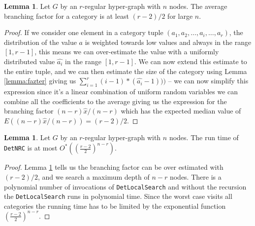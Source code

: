\documentclass{book}
\theoremstyle{definition}
\newtheorem{lemma}[theorem]{Lemma}
\begin{document}
\begin{lemma} \label{lemma:time}
  Let $G$ by an $r$-regular hyper-graph with $n$ nodes. The average branching factor for a category is at least $(r - 2) / 2$ for large $n$.
\end{lemma}
\begin{proof}
  If we consider one element in a category tuple $(a_1, a_2, \dots, a_i, \dots, a_r)$, the distribution of the value $a$ is weighted towards low values and always in the range $[1,r-1]$, this means we can over-estimate the value with a uniformly distributed value $\hat{a_i}$ in the range $[1,r-1]$. We can now extend this estimate to the entire tuple, and we can then estimate the size of the category using Lemma \ref{lemma:fazter} giving us $\sum^r_{i=1} (i - 1) * (\hat{a_i} - 1)))$ -- we can now simplify this expression since it's a linear combination of uniform random variables we can combine all the coefficients to the average giving us the expression for the branching factor $(n-r)\hat{x}/(n - r)$ which has the expected median value of $E((n-r)\hat{x}/(n - r)) = (r - 2) / 2$.
\end{proof}

\begin{lemma}
  Let $G$ by an $r$-regular hyper-graph with $n$ nodes. The run time of \texttt{DetNRC} is at most $O^*((\frac{r - 2}{2})^{n - r})$.
\end{lemma}
\begin{proof}
  Lemma \ref{lemma:time} tells us the branching factor can be over estimated with $(r - 2) / 2$, and we search a maximum depth of $n - r$ nodes. There is a polynomial number of invocations of \texttt{DetLocalSearch} and without the recursion the \texttt{DetLocalSearch} runs in polynomial time. Since the worst case visits all categories the running time has to be limited by the exponential function $(\frac{r - 2}{2})^{n - r}$.
\end{proof}



\end{document}
